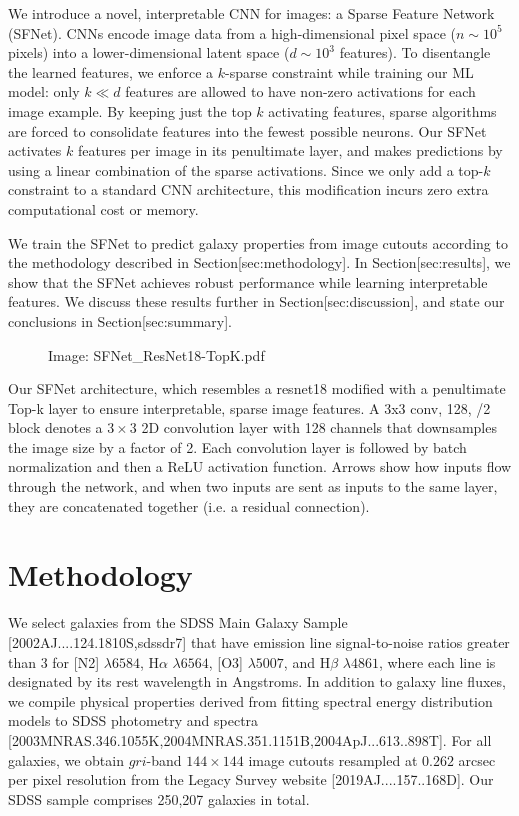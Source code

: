\documentclass[11pt,a4paper]{article}
\begin{document}
We introduce a novel, interpretable CNN for images: a Sparse Feature Network (SFNet).
CNNs encode image data from a high-dimensional pixel space ($n \sim 10^5$ pixels) into a lower-dimensional latent space ($d \sim 10^3$ features). 
To disentangle the learned features, we enforce a $k$-sparse constraint while training our ML model: only $k \ll d$ features are allowed to have non-zero activations for each image example. By keeping just the top $k$ activating features, sparse algorithms are forced to consolidate features into the fewest possible neurons.
Our SFNet activates $k$ features per image in its penultimate layer, and makes predictions by using a linear combination of the sparse activations. 
Since we only add a top-$k$ constraint to a standard CNN architecture, this modification incurs zero extra computational cost or memory.

We train the SFNet to predict galaxy properties from image cutouts according to the methodology described in Section[sec:methodology]. In Section[sec:results], we show that the SFNet achieves robust performance while learning interpretable features. We discuss these results further in Section[sec:discussion], and state our conclusions in Section[sec:summary].

\begin{figure}[h]
\caption{Image: SFNet\_ResNet18-TopK.pdf}
\end{figure}

Our SFNet architecture, which resembles a resnet18 modified with a penultimate Top-k layer to ensure interpretable, sparse image features. A 3x3 conv, 128, /2 block denotes a $3\times 3$ 2D convolution layer with 128 channels that downsamples the image size by a factor of 2. Each convolution layer is followed by batch normalization and then a ReLU activation function. Arrows show how inputs flow through the network, and when two inputs are sent as inputs to the same layer, they are concatenated together (i.e. a residual connection).

\section{Methodology}

We select galaxies from the SDSS Main Galaxy Sample [2002AJ....124.1810S,sdssdr7] that have emission line signal-to-noise ratios greater than 3 for [N2] $\lambda6584$, H$\alpha$ $\lambda6564$, [O3] $\lambda5007$, and H$\beta$ $\lambda4861$, where each line is designated by its rest wavelength in Angstroms. In addition to galaxy line fluxes, we compile physical properties derived from fitting spectral energy distribution models to SDSS photometry and spectra [2003MNRAS.346.1055K,2004MNRAS.351.1151B,2004ApJ...613..898T]. For all galaxies, we obtain $gri$-band $144\times 144$ image cutouts resampled at $0.262$ arcsec per pixel resolution from the Legacy Survey website [2019AJ....157..168D]. Our SDSS sample comprises 250,207 galaxies in total.
\end{document}
